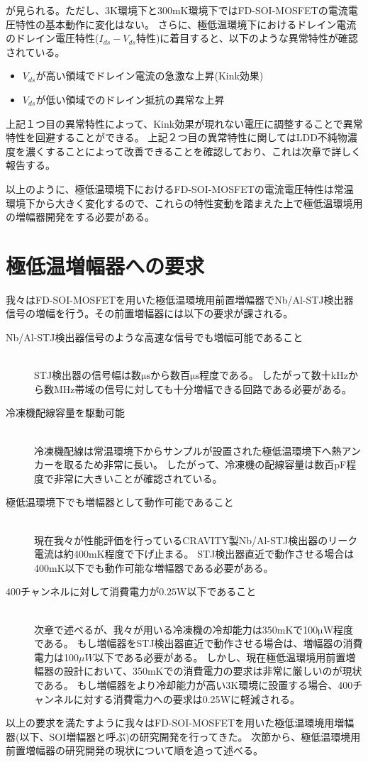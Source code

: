 		が見られる。ただし、3K環境下と300mK環境下ではFD-SOI-MOSFETの電流電圧特性の基本動作に変化はない。
		さらに、極低温環境下におけるドレイン電流のドレイン電圧特性($I_{ds}-V_{ds}$特性)に着目すると、以下のような異常特性が確認されている。
		\begin{itemize}
			\item $V_{ds}$が高い領域でドレイン電流の急激な上昇(Kink効果)
			\item $V_{ds}$が低い領域でのドレイン抵抗の異常な上昇
		\end{itemize}
		上記１つ目の異常特性によって、Kink効果が現れない電圧に調整することで異常特性を回避することができる。
		上記２つ目の異常特性に関してはLDD不純物濃度を濃くすることによって改善できることを確認しており、これは次章で詳しく報告する。
		
		以上のように、極低温環境下におけるFD-SOI-MOSFETの電流電圧特性は常温環境下から大きく変化するので、これらの特性変動を踏まえた上で極低温環境用の増幅器開発をする必要がある。
		\clearpage
		
\section{極低温増幅器への要求}
	我々はFD-SOI-MOSFETを用いた極低温環境用前置増幅器でNb/Al-STJ検出器信号の増幅を行う。その前置増幅器には以下の要求が課される。
	\begin{description}
		\item[Nb/Al-STJ検出器信号のような高速な信号でも増幅可能であること]\mbox{}\\
			STJ検出器の信号幅は数$\mathrm{\mu s}$から数百$\mathrm{\mu s}$程度である。
			したがって数十kHzから数MHz帯域の信号に対しても十分増幅できる回路である必要がある。
		\item[冷凍機配線容量を駆動可能]\mbox{}\\
			冷凍機配線は常温環境下からサンプルが設置された極低温環境下へ熱アンカーを取るため非常に長い。
			したがって、冷凍機の配線容量は数百pF程度で非常に大きいことが確認されている。
		\item[極低温環境下でも増幅器として動作可能であること]\mbox{}\\
			現在我々が性能評価を行っているCRAVITY製Nb/Al-STJ検出器のリーク電流は約400mK程度で下げ止まる。
			STJ検出器直近で動作させる場合は400mK以下でも動作可能な増幅器である必要がある。
		\item[400チャンネルに対して消費電力が$0.25\mathrm{W}$以下であること]\mbox{}\\
			次章で述べるが、我々が用いる冷凍機の冷却能力は350mKで100$\mathrm{\mu W}$程度である。
			もし増幅器をSTJ検出器直近で動作させる場合は、増幅器の消費電力は100$\mu W$以下である必要がある。
			しかし、現在極低温環境用前置増幅器の設計において、350mKでの消費電力の要求は非常に厳しいのが現状である。
			もし増幅器をより冷却能力が高い3K環境に設置する場合、400チャンネルに対する消費電力への要求は0.25$\mathrm{W}$に軽減される。
	\end{description}
	以上の要求を満たすように我々はFD-SOI-MOSFETを用いた極低温環境用増幅器(以下、SOI増幅器と呼ぶ)の研究開発を行ってきた。
	次節から、極低温環境用前置増幅器の研究開発の現状について順を追って述べる。
	\clearpage
